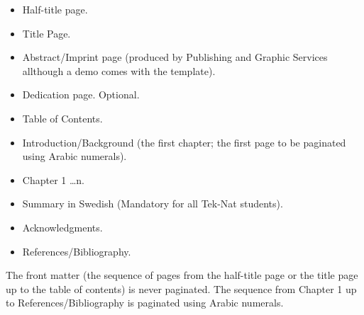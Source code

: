 \begin{itemize}
    \item Half-title page.
    \item Title Page.
    \item Abstract/Imprint page (produced by Publishing and Graphic Services allthough a demo comes with the template).
    \item Dedication page. Optional.
    \item Table of Contents.
    \item Introduction/Background (the first chapter; the first page to be paginated using Arabic numerals).
    \item Chapter 1 \ldots n.
    \item Summary in Swedish (Mandatory for all Tek-Nat students).
    \item Acknowledgments.
    \item References/Bibliography.
\end{itemize}
\vspace{1\baselineskip}
\noindent The front matter (the sequence of pages from the half-title page or the title page up to the table of contents) is never paginated. The sequence from Chapter 1 up to References/Bibliography is paginated using Arabic numerals. 
